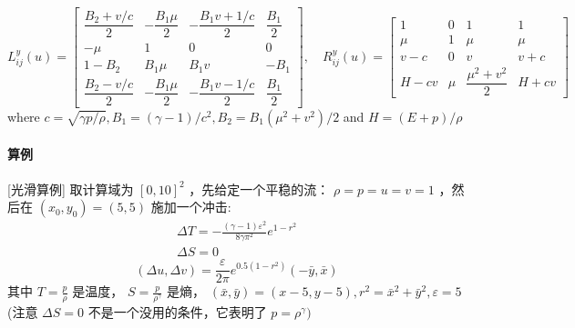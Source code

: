 \documentclass{book}
\begin{document}
\begin{equation}
    L_{i j}^{y}(u)=\begin{bmatrix}
        \dfrac{B_{2}+v / c}{2} & -\dfrac{B_{1} \mu}{2} & -\dfrac{B_{1} v+1 / c}{2} & \dfrac{B_{1}}{2} \\
        -\mu                   & 1                     & 0                         & 0                \\
        1-B_{2}                & B_{1} \mu             & B_{1} v                   & -B_{1}           \\
        \dfrac{B_{2}-v / c}{2} & -\dfrac{B_{1} \mu}{2} & -\dfrac{B_{1} v-1 / c}{2} & \dfrac{B_{1}}{2}
    \end{bmatrix},\quad
    R_{i j}^{y}(u)=\begin{bmatrix}
        1     & 0   & 1                        & 1     \\
        \mu   & 1   & \mu                      & \mu   \\
        v-c   & 0   & v                        & v+c   \\
        H-c v & \mu & \dfrac{\mu^{2}+v^{2}}{2} & H+c v
    \end{bmatrix}
\end{equation}
where  $c=\sqrt{\gamma p / \rho}, B_{1}=(\gamma-1) / c^{2}, B_{2}=B_{1}\left(\mu^{2}+v^{2}\right) / 2$  and  $H=(E+p) / \rho$
\paragraph{算例}

\begin{example}{}{}
    [光滑算例]
    取计算域为  $[0,10]^{2}$  ，先给定一个平稳的流： $\rho=p=u=v=1$  ，然后在  $\left(x_{0}, y_{0}\right)=(5,5)$  施加一个冲击:
    \begin{equation}
        \begin{array}{l}
            \Delta T=-\frac{(\gamma-1) \varepsilon^{2}}{8 \gamma \pi^{2}} e^{1-r^{2}} \\
            \Delta S=0
        \end{array}
    \end{equation}
    \begin{equation}
        (\Delta u, \Delta v)=\frac{\varepsilon}{2 \pi} e^{0.5\left(1-r^{2}\right)}(-\bar{y}, \bar{x})
    \end{equation}
    其中  $T=\frac{p}{\rho}$  是温度，  $S=\frac{p}{\rho^{\gamma}}$  是熵，  $(\bar{x}, \bar{y})=(x-5, y-5) , r^{2}=\bar{x}^{2}+\bar{y}^{2}, \varepsilon=5 $
    (注意 $\Delta S=0$ 不是一个没用的条件，它表明了 $ p=\rho^{\gamma}  )$
\end{example}
\end{document}
